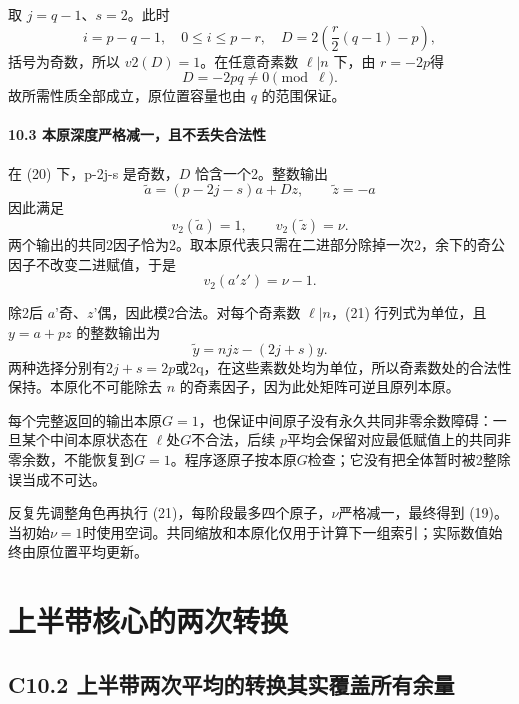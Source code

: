 {取} {\ensuremath{j=q-1}、\ensuremath{s=2}。此时} \[
i=p-q-1,\quad0\le i\le p-r,\quad
D=2\left(\frac r2(q-1)-p\right),
\] {括号为奇数，所以} {\ensuremath{v2(D)=1}。在任意奇素数} {\ensuremath{\ell |n}} {下，由} {\ensuremath{r=-2p}得} \[
D=-2pq\ne0\pmod\ell.
\] {故所需性质全部成立，原位置容量也由} {\ensuremath{q}} {的范围保证。}

\paragraph*{\texorpdfstring{{10.3} {本原深度严格减一，且不丢失合法性}}{10.3 本原深度严格减一，且不丢失合法性}}\label{C9-h73}

{在} {(20)} {下，p-2j-s} {是奇数，\ensuremath{D}} {恰含一个2。整数输出} \[
\widetilde a=(p-2j-s)a+Dz,\qquad
\widetilde z=-a
\] {因此满足} \[
v_2(\widetilde a)=1,\qquad
v_2(\widetilde z)=\nu.
\] {两个输出的共同2因子恰为2。取本原代表只需在二进部分除掉一次2，余下的奇公因子不改变二进赋值，于是} \[
\boxed{v_2(a'z')=\nu-1.}
\tag{C9.23}
\]

{除2后} {\ensuremath{a}'奇、\ensuremath{z}'偶，因此模2合法。对每个奇素数} {\ensuremath{\ell |n}，(21)} {行列式为单位，且} {\ensuremath{y=a+pz}} {的整数输出为} \[
\widetilde y=n jz-(2j+s)y.
\] {两种选择分别有\ensuremath{2j+s=2p}或2q，在这些素数处均为单位，所以奇素数处的合法性保持。本原化不可能除去} {\ensuremath{n}} {的奇素因子，因为此处矩阵可逆且原列本原。}

{每个完整返回的输出本原\ensuremath{G=1}，也保证中间原子没有永久共同非零余数障碍：一旦某个中间本原状态在} {\ensuremath{\ell }处\ensuremath{G}不合法，后续} {\ensuremath{p}平均会保留对应最低赋值上的共同非零余数，不能恢复到\ensuremath{G=1}。程序逐原子按本原\ensuremath{G}检查；它没有把全体暂时被2整除误当成不可达。}

{反复先调整角色再执行} {(21)，每阶段最多四个原子，\ensuremath{\nu }严格减一，最终得到} {(19)。当初始\ensuremath{\nu =1}时使用空词。共同缩放和本原化仅用于计算下一组索引；实际数值始终由原位置平均更新。}


\section{上半带核心的两次转换}\label{construct:common-shape}
\subsection*{\texorpdfstring{{C10.2} {上半带两次平均的转换其实覆盖所有余量}}{C10.2 上半带两次平均的转换其实覆盖所有余量}}\label{C10-h74}

